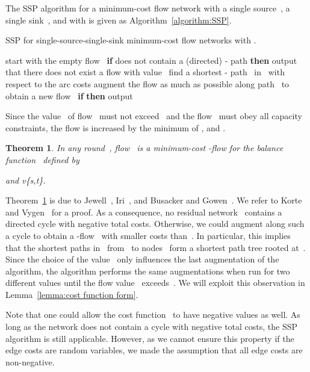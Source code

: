 \documentclass[11pt]{article}
\newtheorem{theorem}{Theorem}
\begin{document}
The SSP algorithm for a minimum-cost flow network with a single source~, a single sink~, and with  is given as Algorithm~\ref{algorithm:SSP}.

\begin{algorithm*}
  \caption{SSP for single-source-single-sink minimum-cost flow networks with .}
  \label{algorithm:SSP}
  \begin{algorithmic}[1]
    \STATE start with the empty flow~
    \FOR{}
      \STATE \textbf{if}  does not contain a (directed) - path \textbf{then} output that there does not exist a flow with value~
      \STATE find a shortest - path~ in~ with respect to the arc costs
      \STATE augment the flow as much as possible along path~ to obtain a new flow~
      \STATE \textbf{if}  \textbf{then} output~
    \ENDFOR
  \end{algorithmic}
  \medskip

  \small  Since the value~ of flow~ must not exceed~ and the flow~ must obey all capacity constraints, the flow is increased by the minimum of ,  and .
\end{algorithm*}

\begin{theorem}
\label{thm:AllFlowsOpt}
In any round~, flow~ is a minimum-cost -flow for the balance function~ defined by

and
v\notin\{s,t\}.
\end{theorem}

Theorem~\ref{thm:AllFlowsOpt} is due to Jewell~\cite{Jew62}, Iri~\cite{Iri60}, and Busacker and Gowen~\cite{BusGow60}. We refer to Korte and Vygen~\cite{Korte:2007:COT:1564997} for a proof.
As a consequence, no residual network~ contains a directed cycle with negative total costs. Otherwise, we could augment along such a cycle to obtain a -flow~ with smaller costs than~. In particular, this implies that the shortest paths in~ from~ to nodes~ form a shortest path tree rooted at~. Since the choice of the value~ only influences the last augmentation of the algorithm, the algorithm performs the same augmentations when run for two different values  until the flow value~ exceeds~. We will exploit this observation in Lemma~\ref{lemma:cost function form}. 

Note that one could allow the cost function~ to have negative values as well. As long as the network does not contain a cycle with negative total costs, the SSP algorithm is still applicable. However, as we cannot ensure this property if the edge costs are random variables, we made the assumption that all edge costs are non-negative.
\end{document}
